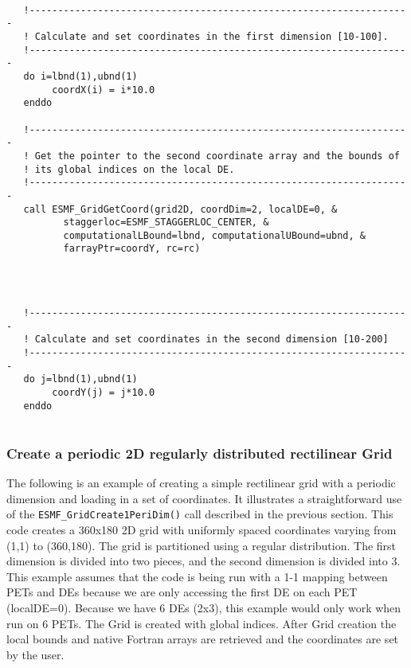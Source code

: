 
 \begin{verbatim}

   !-------------------------------------------------------------------
   ! Calculate and set coordinates in the first dimension [10-100].
   !-------------------------------------------------------------------
   do i=lbnd(1),ubnd(1)
        coordX(i) = i*10.0
   enddo

   !-------------------------------------------------------------------
   ! Get the pointer to the second coordinate array and the bounds of
   ! its global indices on the local DE.
   !-------------------------------------------------------------------
   call ESMF_GridGetCoord(grid2D, coordDim=2, localDE=0, &
          staggerloc=ESMF_STAGGERLOC_CENTER, &
          computationalLBound=lbnd, computationalUBound=ubnd, &
          farrayPtr=coordY, rc=rc)
 
\end{verbatim}
 

 \begin{verbatim}


   !-------------------------------------------------------------------
   ! Calculate and set coordinates in the second dimension [10-200]
   !-------------------------------------------------------------------
   do j=lbnd(1),ubnd(1)
        coordY(j) = j*10.0
   enddo
 
\end{verbatim}
 

  \subsubsection{Create a periodic 2D regularly distributed rectilinear Grid}
   \label{example:2DPeriRegUniGrid}
  
   The following is an example of creating a simple rectilinear grid
   with a periodic dimension and loading in a set of coordinates. It illustrates a straightforward use
   of the {\tt ESMF\_GridCreate1PeriDim()} call described in the previous section.
   This code creates a 360x180 2D grid with uniformly spaced coordinates varying from (1,1) to (360,180).
   The grid is partitioned using a regular distribution. The first dimension
   is divided into two pieces, and the second dimension is divided into 3.
   This example assumes that the code is being run with a 1-1 mapping between
   PETs and DEs because we are only accessing the first DE on each PET (localDE=0).
   Because we have 6 DEs (2x3), this example would only work when run on 6 PETs.
   The Grid is created with global indices. After Grid creation the
   local bounds and native Fortran arrays are retrieved and the
   coordinates are set by the user.
   
